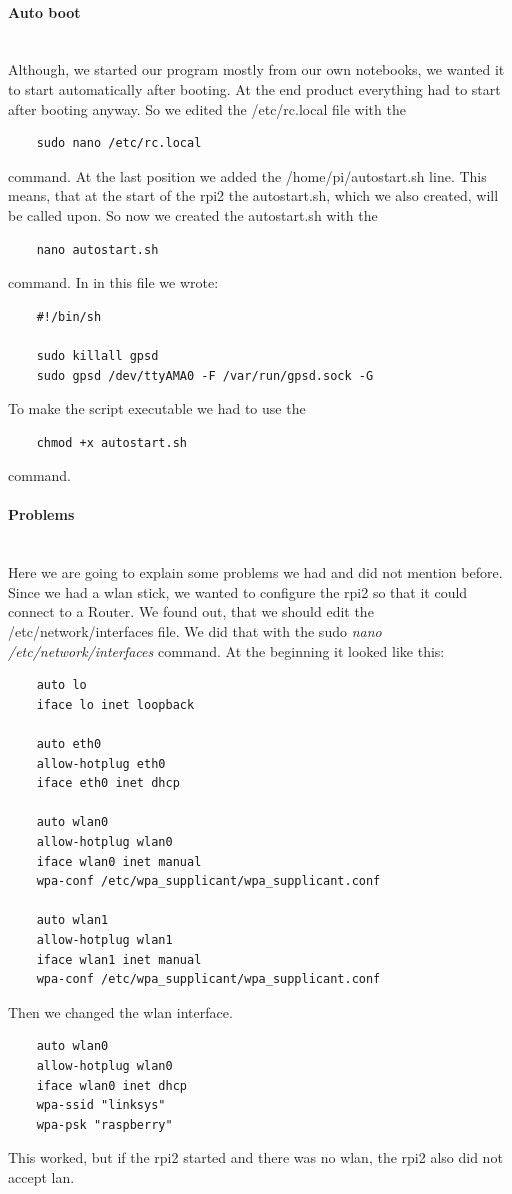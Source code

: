 \paragraph{Auto boot} \mbox{}\\
Although, we started our program mostly from our own notebooks, we wanted it to start automatically after booting. At the end product everything had to start after booting anyway. So we edited the /etc/rc.local file with the \begin{verbatim}
	sudo nano /etc/rc.local
\end{verbatim} 
command. At the last position we added the /home/pi/autostart.sh line.\newline
This means, that at the start of the \gls{rpi2} the autostart.sh, which we also created, will be called upon. So now we created the autostart.sh with the 
\begin{verbatim}
	nano autostart.sh
\end{verbatim}
command. In in this file we wrote:
\begin{verbatim}
	#!/bin/sh

	sudo killall gpsd
	sudo gpsd /dev/ttyAMA0 -F /var/run/gpsd.sock -G
\end{verbatim}
To make the script executable we had to use the \begin{verbatim}
	chmod +x autostart.sh
\end{verbatim}
command.

\paragraph{Problems} \mbox{}\\
Here we are going to explain some problems we had and did not mention before.\newline
Since we had a \gls{wlan} stick, we wanted to configure the \gls{rpi2} so that it could connect to a Router. We found out, that we should edit the /etc/network/interfaces file. We did that with the sudo \textit{nano /etc/network/interfaces} command.
\newline \newline
At the beginning it looked like this:
\begin{verbatim}
	auto lo
	iface lo inet loopback

	auto eth0
	allow-hotplug eth0
	iface eth0 inet dhcp

	auto wlan0
	allow-hotplug wlan0
	iface wlan0 inet manual
	wpa-conf /etc/wpa_supplicant/wpa_supplicant.conf

	auto wlan1
	allow-hotplug wlan1
	iface wlan1 inet manual
	wpa-conf /etc/wpa_supplicant/wpa_supplicant.conf
\end{verbatim}
Then we changed the \gls{wlan} interface.
\begin{verbatim}
	auto wlan0
	allow-hotplug wlan0
	iface wlan0 inet dhcp
	wpa-ssid "linksys"
	wpa-psk "raspberry"
\end{verbatim}
This worked, but  if the \gls{rpi2} started and there was no \gls{wlan}, the \gls{rpi2} also did not accept \gls{lan}.
\newpage
